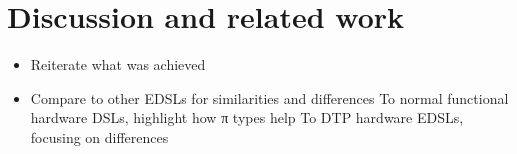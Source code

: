 \chapter{Discussion and related work}
\label{chap:discussion-related-work}
    \begin{itemize}
        \item Reiterate what was achieved
        \item Compare to other \acp{EDSL} for similarities and differences
            \subitem To normal functional hardware DSLs, highlight how π types help
            \subitem To DTP hardware EDSLs, focusing on differences
    \end{itemize}
